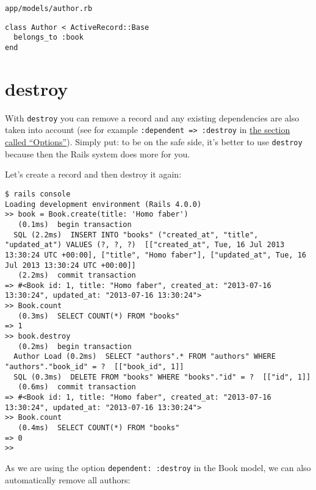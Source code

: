 \documentclass[a4paper]{book}
\begin{document}
\texttt{app/models/author.rb}

\begin{shaded}\begin{verbatim}
class Author < ActiveRecord::Base
  belongs_to :book
end
\end{verbatim}\end{shaded}

\section{destroy}\label{destroy}

With \texttt{destroy} you can remove a record and any existing dependencies are also taken into account (see for example \texttt{:dependent =\textgreater{} :destroy} in \hyperref[activerecordux5f1nux5foptionen]{the section called “Options”}). Simply put: to be on the safe side, it's better to use \texttt{destroy} because then the Rails system does more for you.

Let's create a record and then destroy it again:

\begin{shaded}\begin{verbatim}
$ rails console
Loading development environment (Rails 4.0.0)
>> book = Book.create(title: 'Homo faber')
   (0.1ms)  begin transaction
  SQL (2.2ms)  INSERT INTO "books" ("created_at", "title", "updated_at") VALUES (?, ?, ?)  [["created_at", Tue, 16 Jul 2013 13:30:24 UTC +00:00], ["title", "Homo faber"], ["updated_at", Tue, 16 Jul 2013 13:30:24 UTC +00:00]]
   (2.2ms)  commit transaction
=> #<Book id: 1, title: "Homo faber", created_at: "2013-07-16 13:30:24", updated_at: "2013-07-16 13:30:24">
>> Book.count
   (0.3ms)  SELECT COUNT(*) FROM "books"
=> 1
>> book.destroy
   (0.2ms)  begin transaction
  Author Load (0.2ms)  SELECT "authors".* FROM "authors" WHERE "authors"."book_id" = ?  [["book_id", 1]]
  SQL (0.3ms)  DELETE FROM "books" WHERE "books"."id" = ?  [["id", 1]]
   (0.6ms)  commit transaction
=> #<Book id: 1, title: "Homo faber", created_at: "2013-07-16 13:30:24", updated_at: "2013-07-16 13:30:24">
>> Book.count
   (0.4ms)  SELECT COUNT(*) FROM "books"
=> 0
>>
\end{verbatim}\end{shaded}

As we are using the option \texttt{dependent: :destroy} in the Book model, we can also automatically remove all authors:
\end{document}
